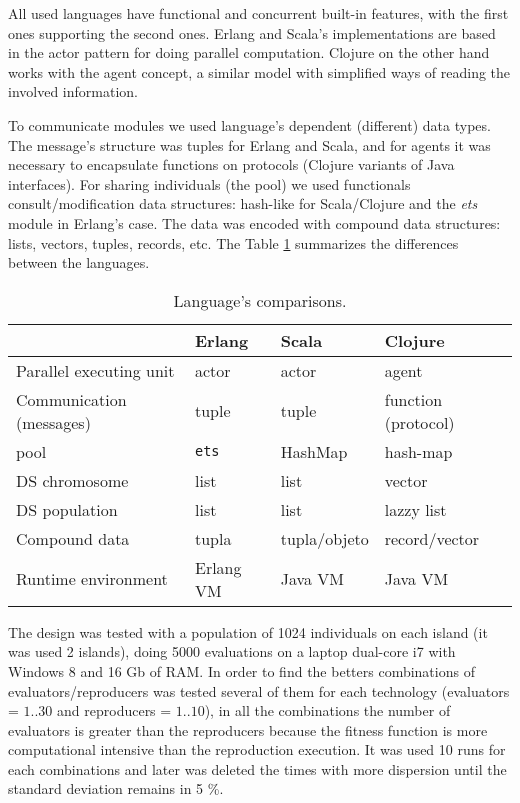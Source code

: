 
All used languages have functional and concurrent built-in features, with the first ones supporting the second ones. Erlang and Scala’s implementations are based in the actor pattern for doing parallel computation. Clojure on the other hand works with the agent concept, a similar model with simplified ways of reading the involved information.

To communicate modules we used language’s dependent (different) data types. The message's structure was tuples for Erlang and Scala, and for agents it was necessary to encapsulate functions on protocols (Clojure variants of Java interfaces). For sharing individuals (the pool) we used functionals consult/modification data structures: hash-like for Scala/Clojure and the {\em ets} module in Erlang’s case. The data was encoded with compound data structures: lists, vectors, tuples, records, etc. The Table \ref{tb:res:comp} summarizes the differences between the languages.

\begin{table}
  \caption{Language's comparisons.}\label{tb:res:comp}
  \centering
  \begin{tabular}{|p{4cm}|>{\centering}p{3cm}|>{\centering}p{3cm}|>{\centering}p{3cm}|}
    \hline
     & \textbf{Erlang} & \textbf{Scala} & \textbf{Clojure} \tabularnewline
    \hline
    Parallel executing unit & actor & actor & agent \tabularnewline
    \hline
    Communication (messages) & tuple & tuple & function (protocol) \tabularnewline
    \hline
    pool & \texttt{ets} & HashMap & hash-map \tabularnewline
    \hline
    DS chromosome & list & list & vector \tabularnewline
    \hline
    DS population & list & list & lazzy list \tabularnewline
    \hline
    Compound data & tupla & tupla/objeto & record/vector \tabularnewline
    \hline
    Runtime environment & Erlang VM & Java VM & Java VM \tabularnewline
    \hline
  \end{tabular}

\end{table}



The design was tested with a population of 1024 individuals on each island (it was used 2 islands), doing 5000 evaluations on a laptop dual-core i7 with Windows 8 and 16 Gb of RAM. In order to find the betters combinations of evaluators/reproducers was tested several of them for each technology (evaluators = $1..30$ and reproducers = $1..10$), in all the combinations the number of evaluators is greater than the reproducers because the fitness function is more computational intensive than the reproduction execution. It was used 10 runs for each combinations and later was deleted the times with more dispersion until the standard deviation remains in 5 \%.

